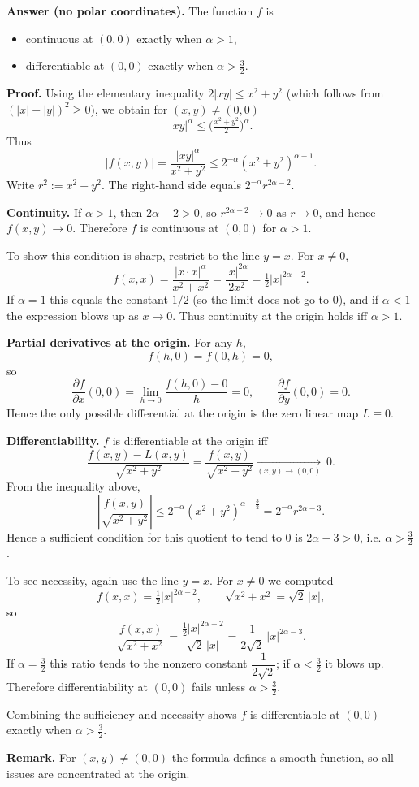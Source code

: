 \documentclass[12pt]{article}
\begin{document}
\begin{correctionbox}
\textbf{Answer (no polar coordinates).} The function \(f\) is
\begin{itemize}
  \item continuous at \((0,0)\) exactly when \(\alpha>1\),
  \item differentiable at \((0,0)\) exactly when \(\alpha>\tfrac{3}{2}\).
\end{itemize}

\medskip

\textbf{Proof.} Using the elementary inequality \(2|xy|\le x^2+y^2\) (which follows from \((|x|-|y|)^2\ge0\)), we obtain for \((x,y)\neq(0,0)\)
\[
|xy|^\alpha \le \Big(\tfrac{x^2+y^2}{2}\Big)^\alpha.
\]
Thus
\[
|f(x,y)|=\frac{|xy|^\alpha}{x^2+y^2}
\le 2^{-\alpha}(x^2+y^2)^{\alpha-1}.
\]
Write \(r^2:=x^2+y^2\). The right-hand side equals \(2^{-\alpha}r^{2\alpha-2}\).  

\textbf{Continuity.} If \(\alpha>1\), then \(2\alpha-2>0\), so \(r^{2\alpha-2}\to0\) as \(r\to0\), and hence \(f(x,y)\to0\). Therefore \(f\) is continuous at \((0,0)\) for \(\alpha>1\).

To show this condition is sharp, restrict to the line \(y=x\). For \(x\neq0\),
\[
f(x,x)=\frac{|x\cdot x|^\alpha}{x^2+x^2}
=\frac{|x|^{2\alpha}}{2x^2}=\tfrac{1}{2}|x|^{2\alpha-2}.
\]
If \(\alpha=1\) this equals the constant \(1/2\) (so the limit does not go to 0), and if \(\alpha<1\) the expression blows up as \(x\to0\). Thus continuity at the origin holds iff \(\alpha>1\).

\textbf{Partial derivatives at the origin.} For any \(h\),
\[
f(h,0)=f(0,h)=0,
\]
so
\[
\frac{\partial f}{\partial x}(0,0)=\lim_{h\to0}\frac{f(h,0)-0}{h}=0,\qquad
\frac{\partial f}{\partial y}(0,0)=0.
\]
Hence the only possible differential at the origin is the zero linear map \(L\equiv0\).

\textbf{Differentiability.} \(f\) is differentiable at the origin iff
\[
\frac{f(x,y)-L(x,y)}{\sqrt{x^2+y^2}}=\frac{f(x,y)}{\sqrt{x^2+y^2}}\xrightarrow[(x,y)\to(0,0)]{}\ 0.
\]
From the inequality above,
\[
\left|\frac{f(x,y)}{\sqrt{x^2+y^2}}\right|
\le 2^{-\alpha} (x^2+y^2)^{\alpha-\tfrac{3}{2}}
=2^{-\alpha} r^{2\alpha-3}.
\]
Hence a sufficient condition for this quotient to tend to \(0\) is \(2\alpha-3>0\), i.e. \(\alpha>\tfrac{3}{2}\).

To see necessity, again use the line \(y=x\). For \(x\neq0\) we computed
\[
f(x,x)=\tfrac{1}{2}|x|^{2\alpha-2},\qquad \sqrt{x^2+x^2}=\sqrt{2}\,|x|,
\]
so
\[
\frac{f(x,x)}{\sqrt{x^2+x^2}}=\frac{\tfrac{1}{2}|x|^{2\alpha-2}}{\sqrt{2}\,|x|}
=\frac{1}{2\sqrt{2}}\,|x|^{2\alpha-3}.
\]
If \(\alpha=\tfrac{3}{2}\) this ratio tends to the nonzero constant \(\dfrac{1}{2\sqrt{2}}\); if \(\alpha<\tfrac{3}{2}\) it blows up. Therefore differentiability at \((0,0)\) fails unless \(\alpha>\tfrac{3}{2}\).

Combining the sufficiency and necessity shows \(f\) is differentiable at \((0,0)\) exactly when \(\alpha>\tfrac{3}{2}\).

\medskip

\textbf{Remark.} For \((x,y)\neq(0,0)\) the formula defines a smooth function, so all issues are concentrated at the origin.
\end{correctionbox}
\end{document}
